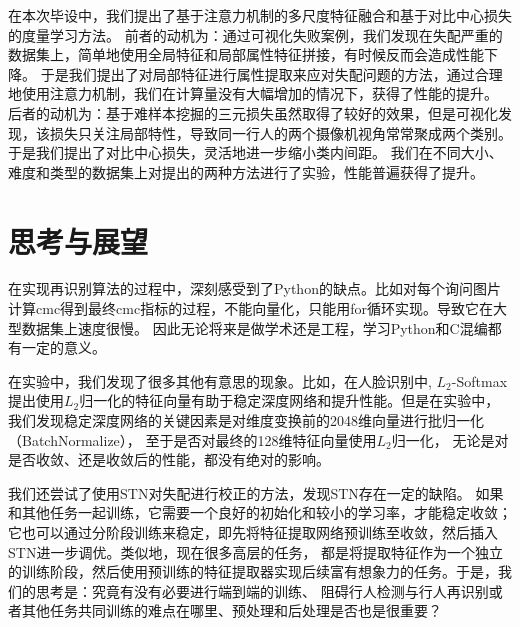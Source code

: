 在本次毕设中，我们提出了基于注意力机制的多尺度特征融合和基于对比中心损失的度量学习方法。
前者的动机为：通过可视化失败案例，我们发现在失配严重的数据集上，简单地使用全局特征和局部属性特征拼接，有时候反而会造成性能下降。
于是我们提出了对局部特征进行属性提取来应对失配问题的方法，通过合理地使用注意力机制，我们在计算量没有大幅增加的情况下，获得了性能的提升。
后者的动机为：基于难样本挖掘的三元损失虽然取得了较好的效果，但是可视化发现，该损失只关注局部特性，导致同一行人的两个摄像机视角常常聚成两个类别。
于是我们提出了对比中心损失，灵活地进一步缩小类内间距。
我们在不同大小、难度和类型的数据集上对提出的两种方法进行了实验，性能普遍获得了提升。

\section{思考与展望}

在实现再识别算法的过程中，深刻感受到了Python的缺点。比如对每个询问图片计算cmc得到最终cmc指标的过程，不能向量化，只能用for循环实现。导致它在大型数据集上速度很慢。
因此无论将来是做学术还是工程，学习Python和C混编都有一定的意义。

在实验中，我们发现了很多其他有意思的现象。比如，在人脸识别中,
$L_2$-Softmax提出使用$L_2$归一化的特征向量有助于稳定深度网络和提升性能。但是在实验中，我们发现稳定深度网络的关键因素是对维度变换前的2048维向量进行批归一化（BatchNormalize），
至于是否对最终的128维特征向量使用$L_2$归一化，
无论是对是否收敛、还是收敛后的性能，都没有绝对的影响。

我们还尝试了使用STN对失配进行校正的方法，发现STN存在一定的缺陷。
如果和其他任务一起训练，它需要一个良好的初始化和较小的学习率，才能稳定收敛；
它也可以通过分阶段训练来稳定，即先将特征提取网络预训练至收敛，然后插入STN进一步调优。类似地，现在很多高层的任务，
都是将提取特征作为一个独立的训练阶段，然后使用预训练的特征提取器实现后续富有想象力的任务。于是，我们的思考是：究竟有没有必要进行端到端的训练、
阻碍行人检测与行人再识别或者其他任务共同训练的难点在哪里、预处理和后处理是否也是很重要？


% 
\printbibliography[heading=chapbib]
